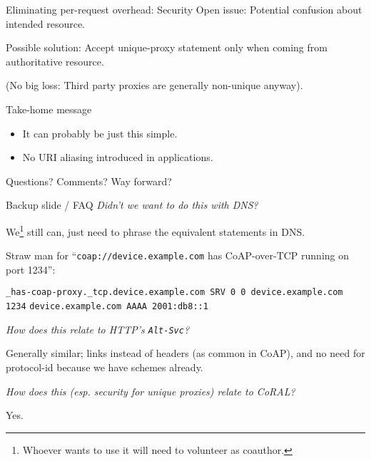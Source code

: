 \documentclass[aspectratio=169]{beamer}
\begin{document}
\begin{frame}{Eliminating per-request overhead: Security}\Large
	Open issue: Potential confusion about intended resource.

	\bigskip

	Possible solution:
	Accept unique-proxy statement only when coming from authoritative resource.

	\bigskip

	(No big loss: Third party proxies are generally non-unique anyway).
\end{frame}

\begin{frame}{Take-home message}\Large 
	\begin{itemize}
		\item It can probably be just this simple.
		\item No URI aliasing introduced in applications.
	\end{itemize}

	\vspace{2cm}

	Questions? Comments? Way forward?
\end{frame}

\begin{frame}{Backup slide / FAQ}
	\setlength{\parskip}{0.3em}
	\textit{Didn't we want to do this with DNS?}

	We\footnote{Whoever wants to use it will need to volunteer as coauthor.} still can, just need to phrase the equivalent statements in DNS.

	Straw man for ``\texttt{coap://device.example.com} has CoAP-over-TCP running on port 1234'':

	\texttt{\_has-coap-proxy.\_tcp.device.example.com SRV 0 0 device.example.com 1234}
	\texttt{device.example.com AAAA 2001:db8::1}

	\bigskip

	\textit{How does this relate to HTTP's \texttt{Alt-Svc}?}

	Generally similar; links instead of headers (as common in CoAP), and no need for protocol-id because we have schemes already.

	\bigskip

	\textit{How does this (esp. security for unique proxies) relate to CoRAL?}

	Yes.
\end{frame}
\end{document}
